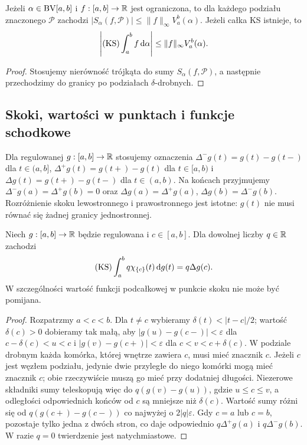 \begin{lemat}
\label{lem:ks-var}
Jeżeli $\alpha\in\mathrm{BV}[a,b]$ i $f:[a,b]\to\mathbb R$ jest ograniczona, to dla każdego podziału znaczonego $\mathcal P$ zachodzi $|S_\alpha(f,\mathcal P)|\le\|f\|_\infty V_a^b(\alpha)$. Jeżeli całka KS istnieje, to
\[
 \left|(\mathrm{KS})\int_a^b f\,\mathrm d\alpha\right|\le\|f\|_\infty V_a^b(\alpha).
\]
\end{lemat}
\begin{proof}
Stosujemy nierówność trójkąta do sumy $S_\alpha(f,\mathcal P)$, a następnie przechodzimy do granicy po podziałach $\delta$-drobnych.
\end{proof}

\subsection*{Skoki, wartości w punktach i funkcje schodkowe}
Dla regulowanej $g:[a,b]\to\mathbb R$ stosujemy oznaczenia $\Delta^-g(t)=g(t)-g(t-)$ dla $t\in(a,b]$, $\Delta^+g(t)=g(t+)-g(t)$ dla $t\in[a,b)$ i $\Delta g(t)=g(t+)-g(t-)$ dla $t\in(a,b)$. Na końcach przyjmujemy $\Delta^-g(a)=\Delta^+g(b)=0$ oraz $\Delta g(a)=\Delta^+g(a)$, $\Delta g(b)=\Delta^-g(b)$. Rozróżnienie skoku lewostronnego i prawostronnego jest istotne: $g(t)$ nie musi równać się żadnej granicy jednostronnej.

\begin{lemat}
\label{lem:ks-point}
Niech $g:[a,b]\to\mathbb R$ będzie regulowana i $c\in[a,b]$. Dla dowolnej liczby $q\in\mathbb R$ zachodzi
\[
 (\mathrm{KS})\int_a^b q\chi_{\{c\}}(t)\,\mathrm dg(t)=q\Delta g(c).
\]
W szczególności wartość funkcji podcałkowej w punkcie skoku nie może być pomijana.
\end{lemat}
\begin{proof}
Rozpatrzmy $a<c<b$. Dla $t\ne c$ wybieramy $\delta(t)<|t-c|/2$; wartość $\delta(c)>0$ dobieramy tak małą, aby $|g(u)-g(c-)|<\varepsilon$ dla $c-\delta(c)<u<c$ i $|g(v)-g(c+)|<\varepsilon$ dla $c<v<c+\delta(c)$. W podziale drobnym każda komórka, której wnętrze zawiera $c$, musi mieć znacznik $c$. Jeżeli $c$ jest węzłem podziału, jedynie dwie przyległe do niego komórki mogą mieć znacznik $c$; obie rzeczywiście muszą go mieć przy dodatniej długości. Niezerowe składniki sumy teleskopują więc do $q(g(v)-g(u))$, gdzie $u\le c\le v$, a odległości odpowiednich końców od $c$ są mniejsze niż $\delta(c)$. Wartość sumy różni się od $q(g(c+)-g(c-))$ co najwyżej o $2|q|\varepsilon$. Gdy $c=a$ lub $c=b$, pozostaje tylko jedna z dwóch stron, co daje odpowiednio $q\Delta^+g(a)$ i $q\Delta^-g(b)$. W razie $q=0$ twierdzenie jest natychmiastowe.
\end{proof}

